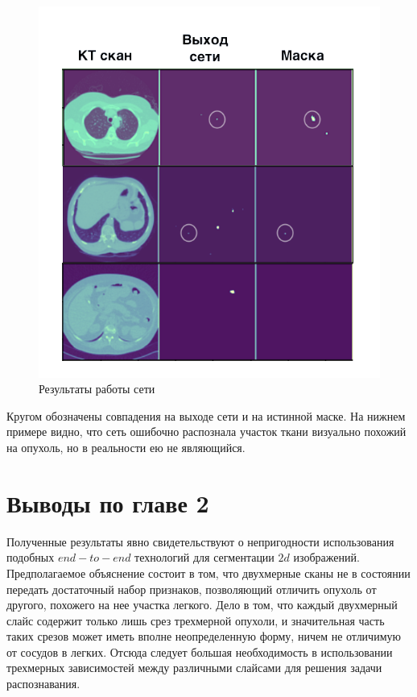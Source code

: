 \begin{figure}[!h]
\includegraphics[width=\linewidth]{images/2d-seg-results.png}
\caption{Результаты работы сети}\label{mirskiy-cgan-architecture}
\centering
\end{figure}

Кругом обозначены совпадения на выходе сети и на истинной маске. На нижнем примере видно, что сеть ошибочно распознала участок ткани визуально похожий на опухоль, но в реальности ею не являющийся.

\section{Выводы по главе 2}

Полученные результаты явно свидетельствуют о непригодности использования подобных $end-to-end$ технологий для сегментации $2d$ изображений. Предполагаемое объяснение состоит в том, что двухмерные сканы не в состоянии передать достаточный набор признаков, позволяющий отличить опухоль от другого, похожего на нее участка легкого. Дело в том, что каждый двухмерный слайс содержит только лишь срез трехмерной опухоли, и значительная часть таких срезов может иметь вполне неопределенную форму, ничем не отличимую от сосудов в легких. Отсюда следует большая необходимость в использовании трехмерных зависимостей между различными слайсами для решения задачи распознавания.

